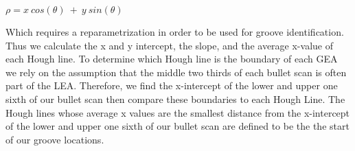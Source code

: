 \documentclass[12pt]{article}
\theoremstyle{nonumberplain}
\begin{document}
\begin{center}
$\rho = x \ cos(\theta) \ + \ y \ sin(\theta)$
\end{center}

Which requires a reparametrization in order to be used for groove identification. Thus we calculate the x and y intercept, the slope, and the average x-value of each Hough line. To determine which Hough line is the boundary of each GEA we rely on the assumption that the middle two thirds of each bullet scan is often part of the LEA. Therefore, we find the x-intercept of the lower and upper one sixth of our bullet scan then compare these boundaries to each Hough Line. The Hough lines whose average x values are the smallest distance from the x-intercept of the lower and upper one sixth of our bullet scan are defined to be the the start of our groove locations. 
\end{document}

